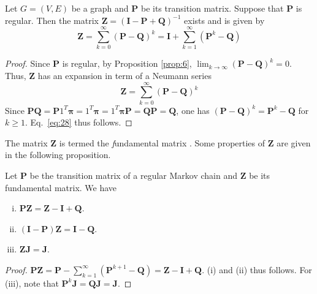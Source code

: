 \begin{proposition}
  \label{prop:7}
  Let $G = (V,E)$ be a graph and $\mathbf{P}$ be its transition
  matrix. Suppose that $\mathbf{P}$ is regular. Then the matrix $\mathbf{Z} =
  (\mathbf{I} - \mathbf{P} + \mathbf{Q})^{-1}$ exists and is given by
  \begin{equation}
    \label{eq:28}
    \mathbf{Z} = \sum_{k=0}^{\infty}(\mathbf{P} - \mathbf{Q})^{k} = \mathbf{I} +
    \sum_{k=1}^{\infty}(\mathbf{P}^{k} - \mathbf{Q})
  \end{equation}
  
\end{proposition}
\begin{proof}
  Since $\mathbf{P}$ is regular, by Proposition \ref{prop:6}, $\lim_{k
    \rightarrow \infty}(\mathbf{P} - \mathbf{Q})^{k} = 0$. Thus, $\mathbf{Z}$ has
  an expansion in term of a Neumann series
  \begin{equation}
    \label{eq:29}
    \mathbf{Z} = \sum_{k=0}^{\infty}(\mathbf{P} - \mathbf{Q})^{k}
  \end{equation}
  Since $\mathbf{P}\mathbf{Q} = \mathbf{P}1^{T}\mathbf{\pi} = 1^{T}\mathbf{\pi} = 
  1^{T}\mathbf{\pi}\mathbf{P} = \mathbf{Q}\mathbf{P} = \mathbf{Q}$,  
  one has $(\mathbf{P} - \mathbf{Q})^{k} = \mathbf{P}^{k} - \mathbf{Q}$ for $k \geq
  1$. Eq.~\eqref{eq:28} thus follows. 
\end{proof}
The matrix $\mathbf{Z}$ is termed the {\emph fundamental matrix}
\cite{kemeny83:_finit_markov_chain}. Some properties of
$\mathbf{Z}$ are given in the following proposition.
\begin{proposition}
  \label{prop:8}
  Let $\mathbf{P}$ be the transition matrix of a regular Markov chain and
  $\mathbf{Z}$ be its fundamental matrix. We have
  \begin{enumerate}[(i)]
  \item $\mathbf{P}\mathbf{Z} = \mathbf{Z} - \mathbf{I} + \mathbf{Q}$. 
  \item $(\mathbf{I} - \mathbf{P})\mathbf{Z} = \mathbf{I} - \mathbf{Q}$.
  \item $\mathbf{Z} \mathbf{J} = \mathbf{J}$. 
  \end{enumerate}
\end{proposition}
\begin{proof}
  $\mathbf{P}\mathbf{Z} = \mathbf{P} - \sum_{k=1}^{\infty}(\mathbf{P}^{k+1} - \mathbf{Q})
  = \mathbf{Z} - \mathbf{I} + \mathbf{Q}$. (i) and (ii) thus follows. For (iii),
  note that $\mathbf{P}^{k}\mathbf{J} = \mathbf{Q}\mathbf{J} = \mathbf{J}$. 
\end{proof}

